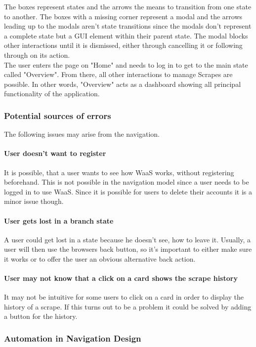 \documentclass[titlepage, 12pt]{article}
\begin{document}
The boxes represent states and the arrows the means to transition from one state to another. The boxes with a missing corner represent a modal and the arrows leading up to the modals aren't state transitions since the modals don't
represent a complete state but a GUI element within their parent state. The modal blocks other interactions until it is dismissed, either through cancelling it or following through on its action. \\
The user enters the page on "Home" and needs to log in to get to the main state called "Overview". From there, all other interactions to manage Scrapes are possible. In other words, "Overview" acts as a dashboard showing all principal functionality of the application.

\subsubsection{Potential sources of errors}
The following issues may arise from the navigation.

\paragraph{User doesn't want to register}
It is possible, that a user wants to see how WaaS works, without registering beforehand.
This is not possible in the navigation model since a user needs to be logged in to use WaaS. Since it is possible for users to delete their accounts it is a minor issue though.

\paragraph{User gets lost in a branch state}
A user could get lost in a state because he doesn't see, how to leave it. Usually, a user will then use the browsers back button, so it's important to either make sure it works or to offer the user an obvious alternative back action.

\paragraph{User may not know that a click on a card shows the scrape history}
It may not be intuitive for some users to click on a card in order to display the history of a scrape. If this turns out to be a problem it could be solved by adding a button for the history.

\subsubsection{Automation in Navigation Design}
\end{document}
